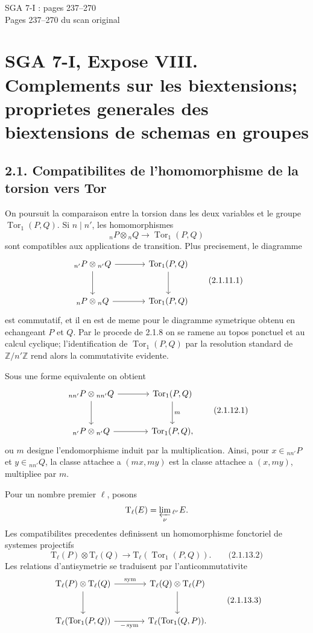 \documentclass[11pt]{article}
\providecommand{\Tor}{\operatorname{Tor}}
\providecommand{\Z}{\mathbb Z}
\providecommand{\Tate}{\mathrm T}
\providecommand{\Tor}{\operatorname{Tor}}
\providecommand{\Z}{\mathbb Z}
\begin{document}
\begin{center}
{\Large SGA 7-I : pages 237--270}\\[0.35em]
{\large Pages 237--270 du scan original}
\end{center}


\section*{SGA 7-I, Expose VIII. Complements sur les biextensions; proprietes generales des biextensions de schemas en groupes}
\subsection*{2.1. Compatibilites de l'homomorphisme de la torsion vers Tor}

On poursuit la comparaison entre la torsion dans les deux variables et le groupe \(\Tor_1(P,Q)\).  Si \(n\mid n'\), les homomorphismes
\[
        {}_nP\otimes {}_nQ\longrightarrow \Tor_1(P,Q)
\]
sont compatibles aux applications de transition.  Plus precisement, le diagramme
\[
\begin{tikzcd}[column sep=large,row sep=large]
 {}_{n'}P\otimes {}_{n'}Q \arrow[r]\arrow[d] & \Tor_1(P,Q)\arrow[d]\\
 {}_{n}P\otimes {}_{n}Q \arrow[r] & \Tor_1(P,Q)
\end{tikzcd}
\qquad\text{(2.1.11.1)}
\]
est commutatif, et il en est de meme pour le diagramme symetrique obtenu en echangeant \(P\) et \(Q\).  Par le procede de 2.1.8 on se ramene au topos ponctuel et au calcul cyclique; l'identification de \(\Tor_1(P,Q)\) par la resolution standard de \(\Z/n'\Z\) rend alors la commutativite evidente.

Sous une forme equivalente on obtient
\[
\begin{tikzcd}[column sep=large,row sep=large]
 {}_{nn'}P\otimes {}_{nn'}Q \arrow[r]\arrow[d] & \Tor_1(P,Q)\arrow[d,"m"]\\
 {}_{n'}P\otimes {}_{n'}Q \arrow[r] & \Tor_1(P,Q),
\end{tikzcd}
\qquad\text{(2.1.12.1)}
\]
ou \(m\) designe l'endomorphisme induit par la multiplication.  Ainsi, pour \(x\in{}_{nn'}P\) et \(y\in{}_{nn'}Q\), la classe attachee a \((mx,my)\) est la classe attachee a \((x,my)\), multipliee par \(m\).

Pour un nombre premier \(\ell\), posons
\[
        \Tate_\ell(E)=\varprojlim_\nu {}_{\ell^\nu}E.
\]
Les compatibilites precedentes definissent un homomorphisme fonctoriel de systemes projectifs
\[
        \Tate_\ell(P)\otimes \Tate_\ell(Q)
        \longrightarrow \Tate_\ell(\Tor_1(P,Q)).
\qquad\text{(2.1.13.2)}
\]
Les relations d'antisymetrie se traduisent par l'anticommutativite
\[
\begin{tikzcd}[column sep=large,row sep=large]
 \Tate_\ell(P)\otimes \Tate_\ell(Q) \arrow[r,"\mathrm{sym}"]\arrow[d] &
 \Tate_\ell(Q)\otimes \Tate_\ell(P)\arrow[d]\\
 \Tate_\ell(\Tor_1(P,Q))\arrow[r,"-\,\mathrm{sym}"'] &
 \Tate_\ell(\Tor_1(Q,P)).
\end{tikzcd}
\qquad\text{(2.1.13.3)}
\]
\end{document}
